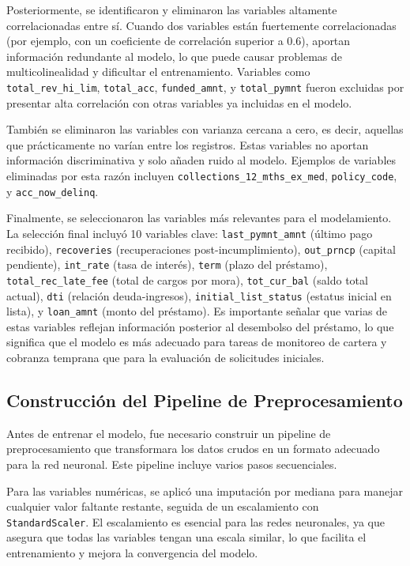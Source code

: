 \documentclass[12pt,a4paper]{article}
\begin{document}
Posteriormente, se identificaron y eliminaron las variables altamente correlacionadas entre sí. Cuando dos variables están fuertemente correlacionadas (por ejemplo, con un coeficiente de correlación superior a 0.6), aportan información redundante al modelo, lo que puede causar problemas de multicolinealidad y dificultar el entrenamiento. Variables como \texttt{total\_rev\_hi\_lim}, \texttt{total\_acc}, \texttt{funded\_amnt}, y \texttt{total\_pymnt} fueron excluidas por presentar alta correlación con otras variables ya incluidas en el modelo.

También se eliminaron las variables con varianza cercana a cero, es decir, aquellas que prácticamente no varían entre los registros. Estas variables no aportan información discriminativa y solo añaden ruido al modelo. Ejemplos de variables eliminadas por esta razón incluyen \texttt{collections\_12\_mths\_ex\_med}, \texttt{policy\_code}, y \texttt{acc\_now\_delinq}.

Finalmente, se seleccionaron las variables más relevantes para el modelamiento. La selección final incluyó 10 variables clave: \texttt{last\_pymnt\_amnt} (último pago recibido), \texttt{recoveries} (recuperaciones post-incumplimiento), \texttt{out\_prncp} (capital pendiente), \texttt{int\_rate} (tasa de interés), \texttt{term} (plazo del préstamo), \texttt{total\_rec\_late\_fee} (total de cargos por mora), \texttt{tot\_cur\_bal} (saldo total actual), \texttt{dti} (relación deuda-ingresos), \texttt{initial\_list\_status} (estatus inicial en lista), y \texttt{loan\_amnt} (monto del préstamo). Es importante señalar que varias de estas variables reflejan información posterior al desembolso del préstamo, lo que significa que el modelo es más adecuado para tareas de monitoreo de cartera y cobranza temprana que para la evaluación de solicitudes iniciales.

\subsection{Construcción del Pipeline de Preprocesamiento}

Antes de entrenar el modelo, fue necesario construir un pipeline de preprocesamiento que transformara los datos crudos en un formato adecuado para la red neuronal. Este pipeline incluye varios pasos secuenciales.

Para las variables numéricas, se aplicó una imputación por mediana para manejar cualquier valor faltante restante, seguida de un escalamiento con \texttt{StandardScaler}. El escalamiento es esencial para las redes neuronales, ya que asegura que todas las variables tengan una escala similar, lo que facilita el entrenamiento y mejora la convergencia del modelo.
\end{document}

